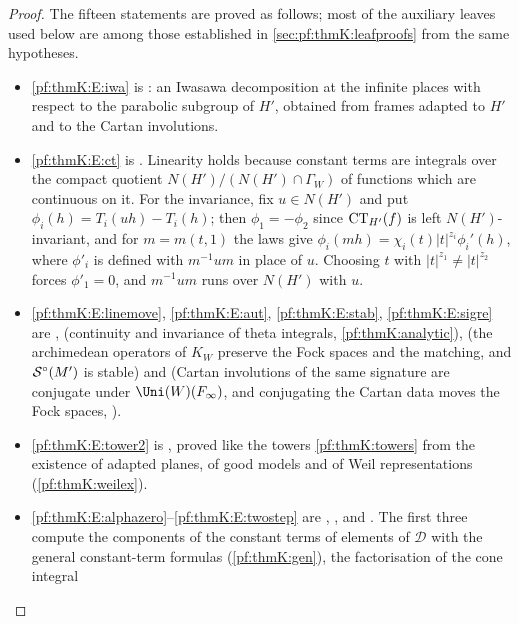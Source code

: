 \begin{proof}
The fifteen statements are proved as follows; most of the auxiliary leaves used below are among those established in
\cref{sec:pf:thmK:leafproofs} from the same hypotheses.
\begin{itemize}
\item \ref{pf:thmK:E:iwa} is : an Iwasawa decomposition at the infinite places with
respect to the parabolic subgroup of $H'$, obtained from frames adapted to $H'$ and to the Cartan involutions.
\item \ref{pf:thmK:E:ct} is . Linearity holds because constant terms are
integrals over the compact quotient $N(H')/(N(H')\cap\Gamma_W)$ of functions which are continuous on it. For the invariance,
fix $u\in N(H')$ and put $\phi_i(h)=T_i(uh)-T_i(h)$; then $\phi_1=-\phi_2$ since $\operatorname{CT}_{H'}(f)$ is left
$N(H')$-invariant, and for $m=m(t,1)$ the laws give $\phi_i(mh)=\chi_i(t)|t|^{z_i}\phi_i'(h)$, where $\phi'_i$ is defined
with $m^{-1}um$ in place of $u$. Choosing $t$ with $|t|^{z_1}\ne|t|^{z_2}$ forces $\phi'_1=0$, and $m^{-1}um$ runs over
$N(H')$ with $u$.
\item \ref{pf:thmK:E:linemove}, \ref{pf:thmK:E:aut}, \ref{pf:thmK:E:stab}, \ref{pf:thmK:E:sigre} are
,  (continuity and
invariance of theta integrals, \cref{pf:thmK:analytic}),  (the
archimedean operators of $K_W$ preserve the Fock spaces and the matching, and $\mathcal{S}^{\circ}(M')$ is stable) and
 (Cartan involutions of the same signature are conjugate under
$\Uni(W)(F_\infty)$, and conjugating the Cartan data moves the Fock spaces, ).
\item \ref{pf:thmK:E:tower2} is , proved like the towers
\cref{pf:thmK:towers} from the existence of adapted planes, of good models and of Weil representations
(\cref{pf:thmK:weilex}).
\item \ref{pf:thmK:E:alphazero}--\ref{pf:thmK:E:twostep} are ,
,  and
. The first three compute the components of the constant terms of
elements of $\mathcal D$ with the general constant-term formulas (\cref{pf:thmK:gen}), the factorisation of the cone integral

\end{itemize}
\end{proof}

